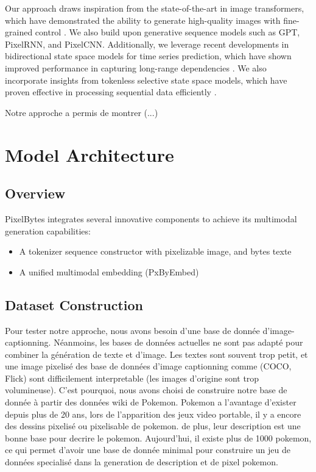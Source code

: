 \documentclass[10pt,a4paper]{article}
\begin{document}
Our approach draws inspiration from the state-of-the-art in image transformers, which have demonstrated the ability to generate high-quality images with fine-grained control \cite{parmar2018image}. We also build upon generative sequence models such as GPT, PixelRNN, and PixelCNN. Additionally, we leverage recent developments in bidirectional state space models for time series prediction, which have shown improved performance in capturing long-range dependencies \cite{bimamba}. We also incorporate insights from tokenless selective state space models, which have proven effective in processing sequential data efficiently \cite{mambabyte}.

Notre approche a permis de montrer (...)

\section{Model Architecture}

\subsection{Overview}
PixelBytes integrates several innovative components to achieve its multimodal generation capabilities:
\begin{itemize}
    \item A tokenizer sequence constructor with pixelizable image, and bytes texte
    \item A unified multimodal embedding (PxByEmbed)
\end{itemize}

\subsection{Dataset Construction}

Pour tester notre approche, nous avons besoin d'une base de donnée d'image-captionning. Néanmoins, les bases de données actuelles ne sont pas adapté pour combiner la génération de texte et d'image. Les textes sont souvent trop petit, et une image pixelisé des base de données d'image captionning comme (COCO, Flick) sont difficilement interpretable (les images d'origine sont trop volumineuse). C'est pourquoi, nous avons choisi de construire notre base de donnée à partir des données wiki de Pokemon. Pokemon a l'avantage d'exister depuis plus de 20 ans, lors de l'apparition des jeux video portable, il y a encore des dessins pixelisé ou pixelisable de pokemon. de plus, leur description est une bonne base pour decrire le pokemon. Aujourd'hui, il existe plus de 1000 pokemon, ce qui permet d'avoir une base de donnée minimal pour construire un jeu de données specialisé dans la generation de description et de pixel pokemon.
\end{document}
